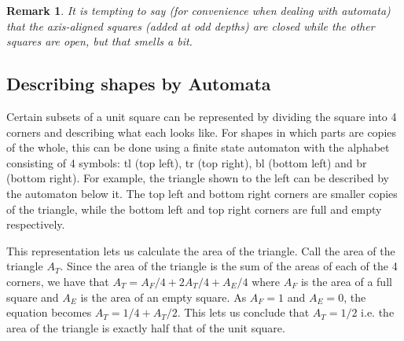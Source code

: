 \documentclass{article}
\newtheorem*{remark}{Remark}
\begin{document}
\begin{remark}
	It is tempting to say (for convenience when dealing with automata) that the axis-aligned squares (added at odd depths) are closed while the other squares are open, but that smells a bit.
\end{remark}

\subsection{Describing shapes by Automata}

\begin{figure}
\end{figure}

Certain subsets of a unit square can be represented by dividing the square into 4 corners and describing what each looks like. For shapes in which parts are copies of the whole, this can be done using a finite state automaton with the alphabet consisting of 4 symbols: tl (top left), tr (top right), bl (bottom left) and br (bottom right). For example, the triangle shown to the left can be described by the automaton below it. The top left and bottom right corners are smaller copies of the triangle, while the bottom left and top right corners are full and empty respectively.

This representation lets us calculate the area of the triangle. Call the area of the triangle $A_T$. Since the area of the triangle is the sum of the areas of each of the 4 corners, we have that $A_T = A_F/4 + 2A_T/4 + A_E/4$ where $A_F$ is the area of a full square and $A_E$ is the area of an empty square. As $A_F=1$ and $A_E=0$, the equation becomes $A_T = 1/4 + A_T/2$. This lets us conclude that $A_T = 1/2$ i.e. the area of the triangle is exactly half that of the unit square.
\end{document}
